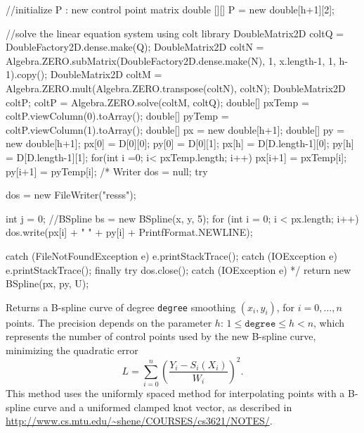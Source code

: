 \begin{code}
\begin{hide}
{      //initialize P : new control point matrix
      double [][] P = new double[h+1][2];

      //solve the linear equation system using colt library
      DoubleMatrix2D coltQ = DoubleFactory2D.dense.make(Q);
      DoubleMatrix2D coltN = Algebra.ZERO.subMatrix(DoubleFactory2D.dense.make(N), 1, x.length-1, 1, h-1).copy();
      DoubleMatrix2D coltM = Algebra.ZERO.mult(Algebra.ZERO.transpose(coltN), coltN);
      DoubleMatrix2D coltP;
      coltP = Algebra.ZERO.solve(coltM, coltQ);
      double[] pxTemp = coltP.viewColumn(0).toArray();
      double[] pyTemp = coltP.viewColumn(1).toArray();
      double[] px = new double[h+1];
      double[] py = new double[h+1];
      px[0] = D[0][0];
      py[0] = D[0][1];
      px[h] = D[D.length-1][0];
      py[h] = D[D.length-1][1];
      for(int i =0; i< pxTemp.length; i++) {
         px[i+1] = pxTemp[i];
         py[i+1] = pyTemp[i];
      }
/*
      Writer dos = null;
      try {
         dos = new FileWriter("resss");

         int j = 0;
         //BSpline bs = new BSpline(x, y, 5);
         for (int i = 0; i < px.length; i++) {
            dos.write(px[i] + "   " + py[i] + PrintfFormat.NEWLINE);
         }
      }
      catch (FileNotFoundException e) {e.printStackTrace(); }
      catch (IOException e) { e.printStackTrace();}
      finally {
         try {
            dos.close();
         }
         catch (IOException e) {}
      }*/
      return new BSpline(px, py, U);
   }\end{hide}
\end{code}
\begin{tabb}
   Returns a B-spline curve of degree \texttt{degree} smoothing
   $(x_i, y_i)$, for $i=0,\ldots,n$ points. The
   precision depends on the parameter $h$: $1 \le \texttt{degree} \le h<n$, which
   represents the number of control points used by the new B-spline curve,
   minimizing the quadratic error
   \[L = \sum_{i=0}^{n}\left( \frac{Y_i - S_i(X_i)}{W_i}\right)^2.\]
   This method uses the uniformly spaced method for interpolating
   points with a B-spline curve and a uniformed clamped knot vector,
   as described in \url{http://www.cs.mtu.edu/~shene/COURSES/cs3621/NOTES/}.
\end{tabb}
\begin{htmlonly}
\end{htmlonly}
